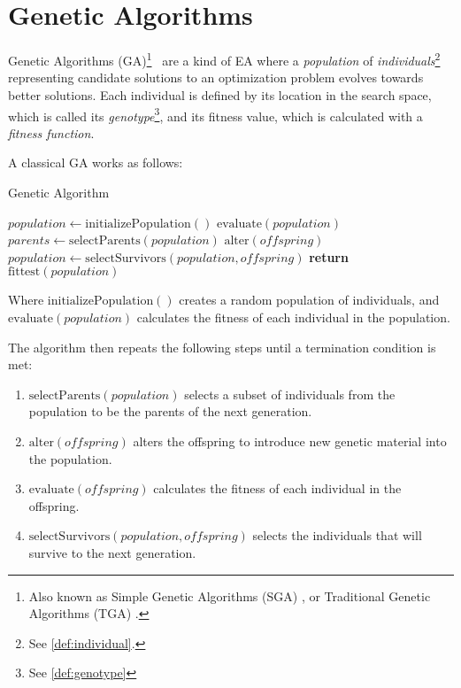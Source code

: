 \section{Genetic Algorithms}
\label{sec:genetic_algorithms}
  Genetic Algorithms (GA)\footnote{
    Also known as Simple Genetic Algorithms (SGA) 
    \autocite{yuIntroductionEvolutionaryAlgorithms2010}, or Traditional Genetic Algorithms (TGA)
    \autocite{shiffmanNatureCode2012}.
  }~\autocite{hollandAdaptationNaturalArtificial1992a,kozaGeneticProgrammingProgramming1992a,yuIntroductionEvolutionaryAlgorithms2010,shiffmanNatureCode2012}
  are a kind of EA where a \emph{population} of \emph{individuals}\footnote{
    See \vref{def:individual}.
  } representing candidate solutions to an optimization problem evolves towards better solutions.
  Each individual is defined by its location in the search space, which is called its
  \emph{genotype}\footnote{See \vref{def:genotype}}, and its fitness value, which is
  calculated with a \emph{fitness function}.

  A classical GA works as follows:

  \begin{algorithm}
    \caption{Genetic Algorithm}\label{alg:genetic_algorithm}
    \begin{algorithmic}
      \State \(\mathit{population} \gets \mathrm{initializePopulation()}\)
      \State \(\mathrm{evaluate}(\mathit{population})\)
      \Repeat
        \State \(\mathit{parents} \gets \mathrm{selectParents}(\mathit{population})\)
        \State \(\mathrm{alter}(\mathit{offspring})\)
        \State \(\mathit{population} \gets \mathrm{selectSurvivors}(\mathit{population},
          \mathit{offspring})\)
      \State \textbf{return} \(\mathrm{fittest}(\mathit{population})\)
    \end{algorithmic}
  \end{algorithm}

  Where \(\mathrm{initializePopulation()}\) creates a random population of individuals, and
  \(\mathrm{evaluate}(\mathit{population})\) calculates the fitness of each individual in the
  population.

  The algorithm then repeats the following steps until a termination condition is met:

  \begin{enumerate}
    \item \(\mathrm{selectParents}(\mathit{population})\) selects a subset of individuals from the
      population to be the parents of the next generation.
    \item \(\mathrm{alter}(\mathit{offspring})\) alters the offspring to introduce new genetic
      material into the population.
    \item \(\mathrm{evaluate}(\mathit{offspring})\) calculates the fitness of each individual in the
      offspring.
    \item \(\mathrm{selectSurvivors}(\mathit{population}, \mathit{offspring})\) selects the
      individuals that will survive to the next generation.
  \end{enumerate}

